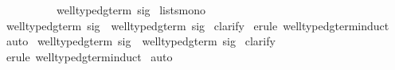 \begin{isabellebody}
\ \ \ \ \ \ \ \ \ {\isasymin}\ well{\isacharunderscore}typed{\isacharunderscore}gterm{\isacharprime}\ sig{\isachardoublequote}\isanewline
{}\ lists{\isacharunderscore}mono\isanewline
\isanewline
\isanewline
{}\ {\isachardoublequote}well{\isacharunderscore}typed{\isacharunderscore}gterm\ sig\ {\isasymsubseteq}\ well{\isacharunderscore}typed{\isacharunderscore}gterm{\isacharprime}\ sig{\isachardoublequote}\isanewline
{}\ clarify\isanewline
{}\ {\isacharparenleft}erule\ well{\isacharunderscore}typed{\isacharunderscore}gterm{\isachardot}induct{\isacharparenright}\isanewline
{}\ auto\isanewline
{}\isanewline
\isanewline
{}\ {\isachardoublequote}well{\isacharunderscore}typed{\isacharunderscore}gterm{\isacharprime}\ sig\ {\isasymsubseteq}\ well{\isacharunderscore}typed{\isacharunderscore}gterm\ sig{\isachardoublequote}\isanewline
{}\ clarify\isanewline
{}\ {\isacharparenleft}erule\ well{\isacharunderscore}typed{\isacharunderscore}gterm{\isacharprime}{\isachardot}induct{\isacharparenright}\isanewline
{}\ auto\isanewline
{}\isanewline
\isanewline
\isanewline
{}\isanewline
\isanewline
\end{isabellebody}%
